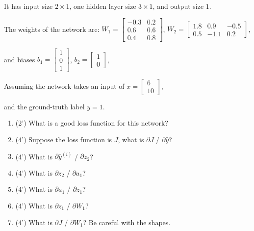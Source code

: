 \documentclass[11pt]{article}\pagestyle{plain}
\begin{document}
It has input size $2\times 1$, one hidden layer size $3\times 1$, and output size $1$.



The weights of the network are: 
$
W_1=
\begin{bmatrix}
	-0.3 & 0.2\\
	0.6 & 0.6\\
	0.4 & 0.8
\end{bmatrix}
$,
$
W_2=
\begin{bmatrix}
	1.8 & 0.9 & -0.5\\
	0.5 & -1.1 & 0.2
\end{bmatrix}
$,

and biases
$
b_1=
\begin{bmatrix}
	1\\
	0\\
	1
\end{bmatrix}
$,
$
b_2=
\begin{bmatrix}
	1\\
	0
\end{bmatrix}
$, 

Assuming the network takes an input of 
$
x=
\begin{bmatrix}
	6\\
	10
\end{bmatrix}
$, 

and the ground-truth label $y=1$.

\begin{enumerate}
	\item (2') What is a good loss function for this network?
	\item (4') Suppose the loss function is $J$, what is ${\partial J}$ / ${\partial \hat{y}}$?
	\item (4') What is ${\partial \hat{y}^{(i)}}$ / ${\partial z_2}$?
	\item (4') What is ${\partial z_2}$ / ${\partial a_1}$?
	\item (4') What is ${\partial a_1}$ / ${\partial z_1}$?
	\item (4') What is ${\partial z_1}$ / ${\partial W_1}$?
	\item (4') What is ${\partial J}$ / ${\partial W_1}$? Be careful with the shapes. 
\end{enumerate}
\end{document}
